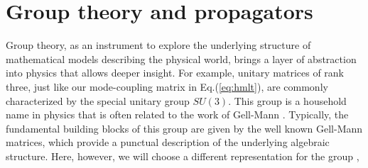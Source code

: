 \documentclass[9pt,twocolumn,twoside]{osajnl}
\begin{document}




\section{Group theory and propagators}

Group theory, as an instrument to explore the underlying structure of mathematical models describing the physical world, brings a layer of abstraction into physics that allows deeper insight.
For example, unitary matrices of rank three, just like our mode-coupling matrix in Eq.(\ref{eq:hmlt}), are commonly characterized by the special unitary group $SU(3)$.
This group is a household name in physics that is often related to the work of Gell-Mann \cite{GellMann1961}.
Typically, the fundamental building blocks of this group are given by the well known Gell-Mann matrices, which provide a punctual description of the underlying algebraic structure.
Here, however, we will choose a different representation for the group \cite{Ticciati1999}, 
\end{document}
